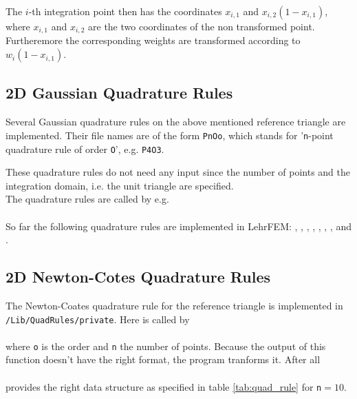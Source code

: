 
The $i$-th integration point then has the coordinates $x_{i,1}$ and $x_{i,2}(1-x_{i,1})$, where $x_{i,1}$ and $x_{i,2}$ are the two coordinates of the non transformed point. Furtheremore the corresponding weights are transformed according to $w_i(1-x_{i,1})$.


\subsection{2D Gaussian Quadrature Rules}   \label{ssect:quad_po}

 Several Gaussian quadrature rules on the above mentioned reference triangle are implemented. Their file names are of the form {\tt PnOo}, which stands for '{\tt n}-point quadrature rule of order {\tt O}', e.g. {\tt P4O3}.

These quadrature rules do not need any input since the number of points and the integration domain, i.e. the unit triangle are specified.\\

 The quadrature rules are called by  e.g.\\

 \\

 So far the following quadrature rules are implemented in LehrFEM: , , , , , , ,  and .


\subsection{2D Newton-Cotes Quadrature Rules}  

 The Newton-Coates quadrature rule for the reference triangle is implemented in {\tt /Lib/QuadRules/private}. Here  is called by \\

 \\

 where {\tt o} is the order and {\tt n} the number of points. Because the output of this function doesn't have the right format, the program  tranforms it. After all \\

 \\

 provides the right data structure as specified in table \ref{tab:quad_rule} for {\tt n}$=10$.

